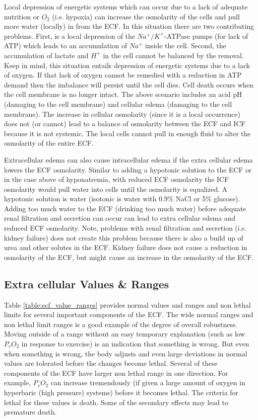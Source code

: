 Local depression of energetic systems which can occur due to a lack of adequate nutrition or $O_2$ (i.e. hypoxia) can increase the osmolarity of the cells and pull more water (locally) in from the ECF. In this situation there are two contributing problems. First, is a local depression of the $Na^+/K^+$-ATPase pumps (for lack of ATP) which leads to an accumulation of $Na^+$ inside the cell. Second, the accumulation of lactate and $H^+$ in the cell cannot be balanced by the removal. Keep in mind, this situation entails depression of energetic systems due to a lack of oxygen. If that lack of oxygen cannot be remedied with a reduction in ATP demand then the imbalance will persist until the cell dies. Cell death occurs when the cell membrane is no longer intact. The above scenario includes an acid pH (damaging to the cell membrane) and cellular edema (damaging to the cell membrane). The increase in cellular osmolarity (since it is a local occurrence) does not (or cannot) lead to a balance of osmolarity between the ECF and ICF because it is not systemic. The local cells cannot pull in enough fluid to alter the osmolarity of the entire ECF.

Extracellular edema can also cause intracellular edema if the extra cellular edema lowers the ECF osmolarity. Similar to adding a hypotonic solution to the ECF or in the case above of hyponatremia, with reduced ECF osmolarity the ICF osmolarity would pull water into cells until the osmolarity is equalized. A hypotonic solution is water (isotonic is water with 0.9\% NaCl or 5\% glucose). Adding too much water to the ECF (drinking too much water) before adequate renal filtration and secretion can occur can lead to extra cellular edema and reduced ECF osmolarity. Note, problems with renal filtration and secretion (i.e. kidney failure) does not create this problem because there is also a build up of urea and other solutes in the ECF. Kidney failure does not cause a reduction in osmolarity of the ECF, but might cause an increase in the osmolarity of the ECF. 

\subsection{Extra cellular Values \& Ranges}

Table \ref{table:ecf_value_ranges} provides normal values and ranges and non lethal limits for several important components of the ECF.  The wide normal ranges and non lethal limit ranges is a good example of the degree of overall robustness. Moving outside of a range without an easy temporary explanation (such as low $P_v O_2$ in response to exercise) is an indication that something is wrong. But even when something is wrong, the body adjusts and even large deviations in normal values are tolerated before the changes become lethal. Several of these components of the ECF have larger non lethal range in one direction. For example, $P_v O_2$ can increase tremendously (if given a large amount of oxygen in hyperbaric (high pressure) systems) before it becomes lethal. The criteria for lethal for these values is death. Some of the secondary effects may lead to premature death. 

